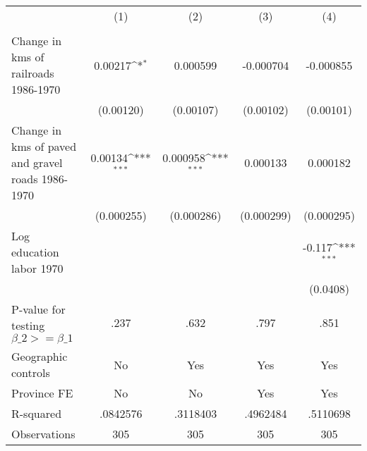 {
\def\sym#1{\ifmmode^{#1}\else\(^{#1}\)\fi}
\begin{tabular}{l*{4}{c}}
\hline\hline
                &\multicolumn{1}{c}{(1)}&\multicolumn{1}{c}{(2)}&\multicolumn{1}{c}{(3)}&\multicolumn{1}{c}{(4)}\\
                &\multicolumn{1}{c}{}&\multicolumn{1}{c}{}&\multicolumn{1}{c}{}&\multicolumn{1}{c}{}\\
\hline
Change in kms of railroads 1986-1970&  0.00217\sym{*}  & 0.000599         &-0.000704         &-0.000855         \\
                &(0.00120)         &(0.00107)         &(0.00102)         &(0.00101)         \\
[1em]
Change in kms of paved and gravel roads 1986-1970&  0.00134\sym{***}& 0.000958\sym{***}& 0.000133         & 0.000182         \\
                &(0.000255)         &(0.000286)         &(0.000299)         &(0.000295)         \\
[1em]
Log education labor 1970&                  &                  &                  &   -0.117\sym{***}\\
                &                  &                  &                  & (0.0408)         \\
\hline
P-value for testing $\beta\_{2} >= \beta\_{1}$&     .237         &     .632         &     .797         &     .851         \\
Geographic controls&       No         &      Yes         &      Yes         &      Yes         \\
Province FE     &       No         &       No         &      Yes         &      Yes         \\
R-squared       & .0842576         & .3118403         & .4962484         & .5110698         \\
Observations    &      305         &      305         &      305         &      305         \\
\hline\hline
\end{tabular}
}
